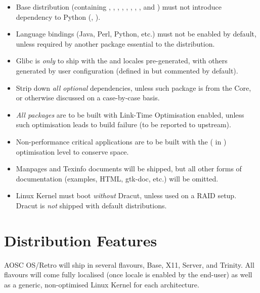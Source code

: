 \documentclass[a5paper,twosided,11pt]{book}
\begin{document}
    \begin{itemize}
        \item Base distribution (containing , , , ,
            , , , , and )
            must not introduce dependency to Python (, ).
        \item Language bindings (Java, Perl, Python, etc.) must not be enabled by default,
            unless required by another package essential to the distribution.
        \item Glibc is \textit{only} to ship with the  and  locales pre-generated,
            with others generated by user configuration (defined in  but commented by default).
        \item Strip down \textit{all optional} dependencies, unless such package is from the Core,
            or otherwise discussed on a case-by-case basis.
        \item \textit{All packages} are to be built with Link-Time Optimisation enabled,
            unless such optimisation leads to build failure (to be reported to upstream).
        \item Non-performance critical applications are to be built with the 
            ( in ) optimisation level to conserve space.
        \item Manpages and Texinfo documents will be shipped, but all other forms of documentation
            (examples, HTML, gtk-doc, etc.) will be omitted.
        \item Linux Kernel must boot \textit{without} Dracut, unless used on a RAID setup.
            Dracut is \textit{not} shipped with default distributions.
    \end{itemize}

    \section{Distribution Features}

    AOSC OS/Retro will ship in several flavours, Base, X11, Server, and Trinity.
    All flavours will come fully localised (once locale is enabled by the end-user) as well as a generic,
    non-optimised Linux Kernel for each architecture.
\end{document}
